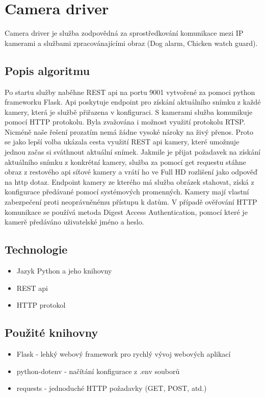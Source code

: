 \section{Camera driver}\label{sec:camera-driver}
Camera driver je služba zodpovědná za sprostředkování komunikace mezi IP kamerami a službami zpracovánajícími obraz (Dog alarm, Chicken watch guard).\newline

\subsection*{Popis algoritmu}
Po startu služby naběhne REST api na portu 9001 vytvořené za pomoci python frameworku Flask.
Api poskytuje endpoint pro získání aktuálního snímku z každé kamery, která je službě přiřazena v konfiguraci.
S kamerami služba komunikuje pomocí HTTP protokolu.
Byla zvažována i možnost využití protokolu RTSP.
Nicméně naše řešení prozatím nemá žádne vysoké nároky na živý přenos.
Proto se jako lepší volba ukázala cesta využití REST api kamery, které umožnuje jednou začas si sváthnout aktuální snímek.
Jakmile je přijat požadavek na získání aktuálního snímku z konkrétní kamery, služba za pomocí get requestu stáhne obraz z restového api síťové kamery a vrátí ho ve Full HD rozlišení jako odpověď na http dotaz.
Endpoint kamery ze kterého má služba obrázek stahovat, získá z konfigurace předávané pomocí systémových promenných.
Kamery mají vlastní zabezpečení proti neoprávněnému přístupu k datům.
V případě ověřování HTTP komunikace se používá metoda Digest Access Authentication, pomocí které je kamerě předáváno uživatelské jméno a heslo.

\subsection*{Technologie}
\begin{itemize}
    \item Jazyk Python a jeho knihovny
    \item REST api
    \item HTTP protokol
\end{itemize}

\subsection*{Použité knihovny}
\begin{itemize}
    \item Flask - lehký webový framework pro rychlý vývoj webových aplikací
    \item python-dotenv - načítání konfigurace z .env souborů
    \item requests - jednoduché HTTP požadavky (GET, POST, atd.)
\end{itemize}

